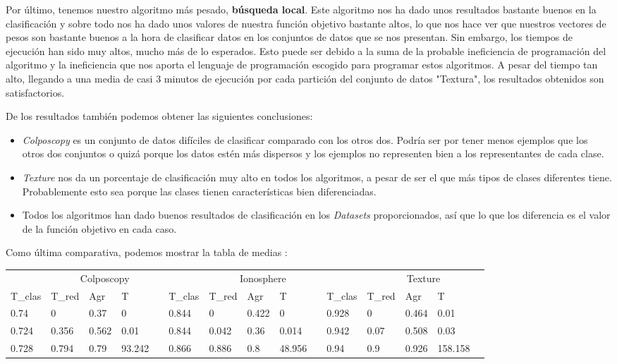 \documentclass[11pt]{article}
\begin{document}
Por último, tenemos nuestro algoritmo más pesado, \textbf{búsqueda local}. Este algoritmo nos ha dado unos resultados bastante buenos en la clasificación y sobre todo nos ha dado unos valores de nuestra función objetivo bastante altos, lo que nos hace ver que nuestros vectores de pesos son bastante buenos a la hora de clasificar datos en los conjuntos de datos que se nos presentan. Sin embargo, los tiempos de ejecución han sido muy altos, mucho más de lo esperados. Esto puede ser debido a la suma de la probable ineficiencia de programación del algoritmo y la ineficiencia que nos aporta el lenguaje de programación escogido para programar estos algoritmos. A pesar del tiempo tan alto, llegando a una media de casi 3 minutos de ejecución por cada partición del conjunto de datos "Textura", los resultados obtenidos son satisfactorios.

De los resultados también podemos obtener las siguientes conclusiones:
\begin{itemize}
	\item \emph{Colposcopy} es un conjunto de datos difíciles de clasificar comparado con los otros dos. Podría ser por tener menos ejemplos que los otros dos conjuntos o quizá porque los datos estén más dispersos y los ejemplos no representen bien a los representantes de cada clase.
	
	\item \emph{Texture} nos da un porcentaje de clasificación muy alto en todos los algoritmos, a pesar de ser el que más tipos de clases diferentes tiene. Probablemente esto sea porque las clases tienen características bien diferenciadas.
	
	
	\item Todos los algoritmos han dado buenos resultados de clasificación en los \emph{Datasets} proporcionados, así que lo que los diferencia es el valor de la función objetivo en cada caso.
\end{itemize}

Como última comparativa, podemos mostrar la tabla de medias :\\
\small\hspace{-2cm}\begin{tabular}{lllllllllllllll}
 & \multicolumn{4}{c}{Colposcopy}   &  & \multicolumn{4}{c}{Ionosphere}   &  & \multicolumn{4}{c}{Texture}        \\
 T\_clas & T\_red & Agr  & T      & & T\_clas & T\_red & Agr  & T      &  & T\_clas & T\_red & Agr   & T       \\
     0.74     & 0       & 0.37  & 0 &  & 0.844    & 0       & 0.422 & 0 &  & 0.928   & 0      & 0.464 & 0.01\\
     0.724   & 0.356  & 0.562 & 0.01 &  & 0.844   & 0.042  & 0.36 & 0.014 &  & 0.942   & 0.07   & 0.508 & 0.03\\
	 0.728   & 0.794  & 0.79 & 93.242 &  & 0.866   & 0.886  & 0.8  & 48.956 &  & 0.94    & 0.9    & 0.926 & 158.158\\
\end{tabular}\\
\end{document}
